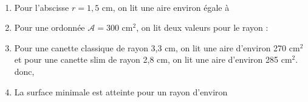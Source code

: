 \ \\ [-5mm]
\begin{enumerate}
   \item Pour l'abscisse $r =1,5$ cm, on lit une aire environ égale à 
   \item Pour une ordonnée $\mathcal{A} =300$ cm$^2$, on lit deux valeurs pour le rayon : 
   \item Pour une canette classique de rayon 3,3 cm, on lit une aire d'environ 270 cm$^2$ et pour une canette slim de rayon 2,8 cm, on lit une aire d'environ 285 cm$^2$. donc, \\
   \item La surface minimale est atteinte pour un rayon d'environ 
\end{enumerate}
